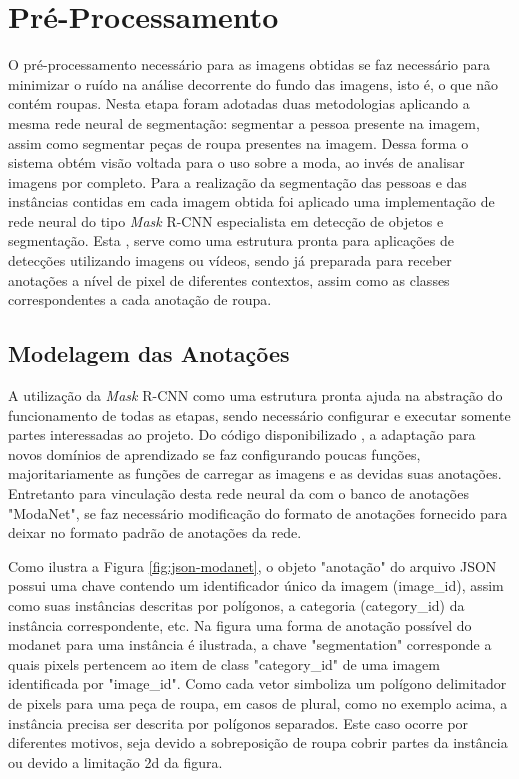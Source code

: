 \documentclass[12pt]{report}
\begin{document}
\section{Pré-Processamento}

O pré-processamento necessário para as imagens obtidas se faz necessário para minimizar o ruído na análise decorrente do fundo das imagens, isto é, o que não contém roupas. Nesta etapa foram adotadas duas metodologias aplicando a mesma rede neural de segmentação: segmentar a pessoa presente na imagem, assim como segmentar peças de roupa presentes na imagem. Dessa forma o sistema obtém visão voltada para o uso sobre a moda, ao invés de analisar imagens por completo. 
Para a realização da segmentação das pessoas e das instâncias contidas em cada imagem obtida foi aplicado uma implementação de rede neural do tipo \textit{Mask} R-CNN especialista em detecção de objetos e segmentação. Esta \cite{maskrcnnimplem}, serve como uma estrutura pronta para aplicações de detecções utilizando imagens ou vídeos, sendo já preparada para receber anotações a nível de pixel de diferentes contextos, assim como as classes correspondentes a cada anotação de roupa.

\subsection{Modelagem das Anotações}

A utilização da \textit{Mask} R-CNN como uma estrutura pronta ajuda na abstração do funcionamento de todas as etapas, sendo necessário configurar e executar somente partes interessadas ao projeto. Do código disponibilizado \cite{maskrcnnimplem}, a adaptação para novos domínios de aprendizado se faz configurando poucas funções, majoritariamente as funções de carregar as imagens e as devidas suas anotações. Entretanto para vinculação desta rede neural da com o banco de anotações "ModaNet", se faz necessário modificação do formato de anotações fornecido para deixar no formato padrão de anotações da rede.

Como ilustra a Figura \ref{fig:json-modanet}, o objeto "anotação" do arquivo JSON possui uma chave contendo um identificador único da imagem (image\_id), assim como suas instâncias descritas por polígonos, a categoria (category\_id) da instância correspondente, etc. Na figura uma forma de anotação possível do modanet para uma instância é ilustrada, a chave "segmentation" corresponde a quais pixels pertencem ao item de class "category\_id" de uma imagem identificada por "image\_id". Como cada vetor simboliza um polígono delimitador de pixels para uma peça de roupa, em casos de plural, como no exemplo acima, a instância precisa ser descrita por polígonos separados. Este caso ocorre por diferentes motivos, seja devido a sobreposição de roupa cobrir partes da instância ou devido a limitação 2d da figura.
\end{document}
